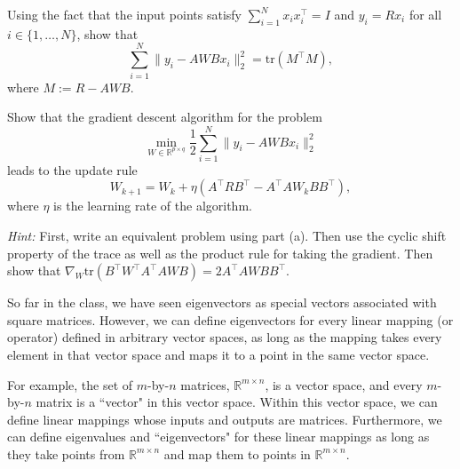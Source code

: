 \begin{enumerate}
    
    \qitem  Using the fact that the input points satisfy $\sum_{i=1}^N x_ix_i^\top = I$  and $y_i = Rx_i$ for all $i \in \{1, \dots, N\}$, show that
    \[
    \sum_{i=1}^N \|y_i - AWB x_i \|_2^2 = \text{tr}(M^\top M),
    \]
    where $M:= R-AWB$.
    
    
    
    \sol{}
    
    \qitem Show that the gradient descent algorithm for the problem 
    \[ \min_{W \in \mathbb R^{p \times q}} \dfrac{1}{2} \sum_{i=1}^N \|y_i - AWBx_i\|_2^2 \]
    leads to the update rule
    \[ W_{k+1} = W_k + \eta \left( A^\top R B^\top -  A^\top A W_k BB^\top \right),
    \]
    where $\eta$ is the learning rate of the algorithm.
    
    \emph{Hint: } First, write an equivalent problem using part (a). Then use the cyclic shift property of the trace as well as the product rule for taking the gradient. 
    Then show that
    $\nabla_W \text{tr}(B^\top W^\top A^\top AWB)  = 2 A^\top A W BB^\top$.
    
    \sol{}
    
    
    
    \qitem So far in the class, we have seen eigenvectors as special vectors associated with square matrices. However, we can define eigenvectors for every linear mapping (or operator) defined in arbitrary vector spaces, as long as the mapping takes every element in that vector space and maps it to a point in the same vector space.



For example, the set of $m$-by-$n$ matrices, $\mathbb R^{m \times n}$, is a vector space, and every $m$-by-$n$ matrix is a ``vector" in this vector space.
Within this vector space, we can define linear mappings whose inputs and outputs are matrices. Furthermore,
we can define eigenvalues and ``eigenvectors" for these linear mappings as long as they take points from $\mathbb R^{m \times n}$ and map them to points in $\mathbb R^{m \times n}$.



\end{enumerate}
